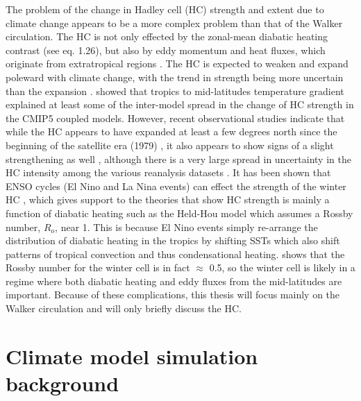 \documentclass[letterpaper,12pt,titlepage,oneside,final]{book}
\begin{document}
The problem of the change in Hadley cell (HC) strength and extent due to climate change appears to be a more complex problem than that of the Walker circulation. The HC is not only effected by the zonal-mean diabatic heating contrast (see eq. 1.26), but also by eddy momentum and heat fluxes, which originate from extratropical regions \citep{walker_eddy_2006,kim_hadley_2001}. The HC is expected to weaken and expand poleward with climate change, with the trend in strength being more uncertain than the expansion \citep{he_anthropogenic_2015,vecchi_global_2007,bony_robust_2013,gastineau_hadley_2009,ma_mechanisms_2011,lu_expansion_2007}. \citep{seo_mechanism_2014} showed that tropics to mid-latitudes temperature gradient explained at least some of the inter-model spread in the change of HC strength in the CMIP5 coupled models. However, recent observational studies indicate that while the HC appears to have expanded at least a few degrees north since the beginning of the satellite era (1979) \citep{johanson_hadley_2009,seidel_recent_2007,hu_observed_2007}, it also appears to show signs of a slight strengthening as well \citep{mitas_has_2005,hu_observed_2007,stachnik_comparison_2011}, although there is a very large spread in uncertainty in the HC intensity among the various reanalysis datasets \citep{stachnik_comparison_2011}. It has been shown that ENSO cycles (El Nino and La Nina events) can effect the strength of the winter HC \citep{oort_observed_1996,quan_change_2004}, which gives support to the theories that show HC strength is mainly a function of diabatic heating such as the Held-Hou model \citep{held_nonlinear_1980} which assumes a Rossby number, $R_{o}$, near 1. This is because El Nino events simply re-arrange the distribution of diabatic heating in the tropics by shifting SSTs which also shift patterns of tropical convection and thus condensational heating. \citep{caballero_role_2007} shows that the Rossby number for the winter cell is in fact $\approx$ 0.5, so the winter cell is likely in a regime where both diabatic heating and eddy fluxes from the mid-latitudes are important. Because of these complications, this thesis will focus mainly on the Walker circulation and will only briefly discuss the HC.


\chapter{Climate model simulation background}
\end{document}
